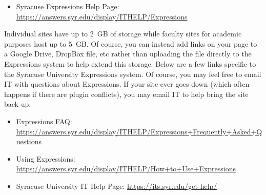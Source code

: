 	\begin{itemize}
	\item Syracuse Expressions Help Page: \url{https://answers.syr.edu/display/ITHELP/Expressions}
	\end{itemize}

Individual sites have up to 2~GB of storage while faculty sites for academic purposes host up to 5~GB. Of course, you can instead add links on your page to a Google Drive, DropBox file, etc rather than uploading the file directly to the Expressions system to help extend this storage. Below are a few links specific to the Syracuse University Expressions system. Of course, you may feel free to email IT with questions about Expressions. If your site ever goes down (which often happens if there are plugin conflicts), you may email IT to help bring the site back up.

	\begin{itemize}
	\item Expressions FAQ: \url{https://answers.syr.edu/display/ITHELP/Expressions+Frequently+Asked+Questions}
	\item Using Expressions: \url{https://answers.syr.edu/display/ITHELP/How+to+Use+Expressions}
	\item Syracuse University IT Help Page: \url{https://its.syr.edu/get-help/}
	\end{itemize}


























